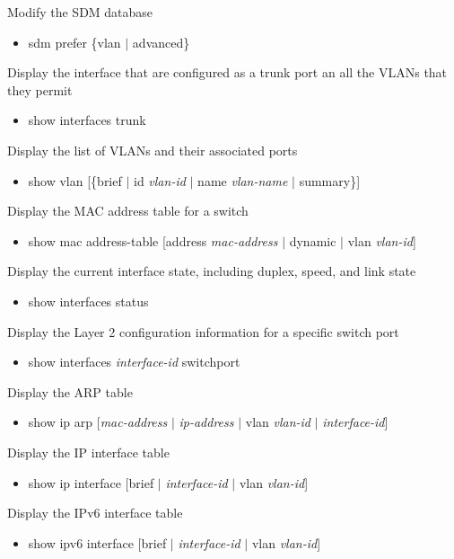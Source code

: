\documentclass{article}
\begin{document}
Modify the SDM database
\begin{itemize}
\item sdm prefer \{vlan $|$ advanced\}
\end{itemize}

Display the interface that are configured as a trunk port an all the VLANs that they permit
\begin{itemize}
\item show interfaces trunk
\end{itemize}

Display the list of VLANs and their associated ports
\begin{itemize}
\item show vlan [\{brief $|$ id \textit{vlan-id} $|$ name \textit{vlan-name} $|$ summary\}]
\end{itemize}

Display the MAC address table for a switch
\begin{itemize}
\item show mac address-table [address \textit{mac-address} $|$ dynamic $|$ vlan \textit{vlan-id}]
\end{itemize}

Display the current interface state, including duplex, speed, and link state
\begin{itemize}
\item show interfaces status
\end{itemize}

Display the Layer 2 configuration information for a specific switch port
\begin{itemize}
\item show interfaces \textit{interface-id} switchport
\end{itemize}

Display the ARP table
\begin{itemize}
\item show ip arp [\textit{mac-address} $|$ \textit{ip-address} $|$ vlan \textit{vlan-id} $|$ \textit{interface-id}]
\end{itemize}

Display the IP interface table
\begin{itemize}
\item show ip interface [brief $|$ \textit{interface-id} $|$ vlan \textit{vlan-id}]
\end{itemize}

Display the IPv6 interface table
\begin{itemize}
\item show ipv6 interface [brief $|$ \textit{interface-id} $|$ vlan \textit{vlan-id}]
\end{itemize}
\end{document}
